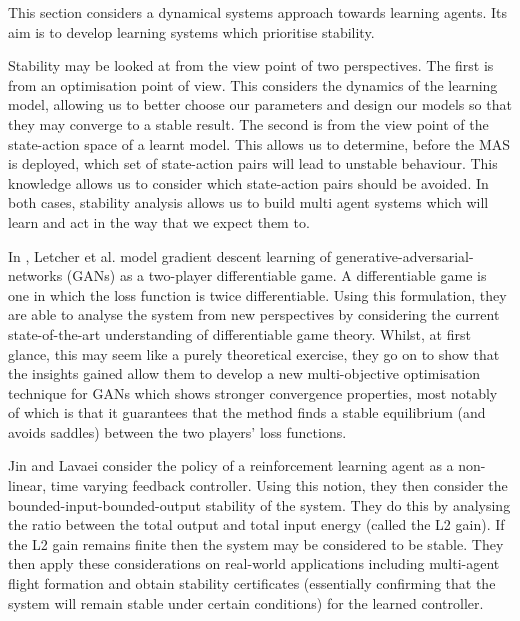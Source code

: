 \documentclass[../sample.tex]{subfiles}
\begin{document}
This section considers a dynamical systems approach towards learning agents. Its aim is to develop learning systems which prioritise stability. 

Stability may be looked at from the view point of two perspectives. The first is from an
optimisation point of view. This considers the dynamics of the learning model, allowing us to better
choose our parameters and design our models so that they may converge to a stable result. The second
is from the view point of the state-action space of a learnt model. This allows us to determine,
before the MAS is deployed, which set of state-action pairs will lead to unstable behaviour. This
knowledge allows us to consider which state-action pairs should be avoided. In both cases, stability
analysis allows us to build multi agent systems which will learn and act in the way that we expect
them to.

In \cite{Letcher2019DifferentiableMechanics}, Letcher et al. model gradient descent learning of
generative-adversarial-networks (GANs) as a two-player differentiable game. A differentiable game is
one in which the loss function is twice differentiable. Using this formulation, they are able to
analyse the system from new perspectives by considering the current state-of-the-art understanding
of differentiable game theory. Whilst, at first glance, this may seem like a purely theoretical
exercise, they go on to show that the insights gained allow them to develop a new multi-objective
optimisation technique for GANs which shows stronger convergence properties, most notably of which
is that it guarantees that the method finds a stable equilibrium (and avoids saddles) between the
two players' loss functions.

Jin and Lavaei \cite{Jin2018Stability-certifiedPerspective} consider the policy of a reinforcement
learning agent as a non-linear, time varying feedback controller. Using this notion, they then
consider the bounded-input-bounded-output stability of the system. They do this by analysing the
ratio between the total output and total input energy (called the L2 gain). If the L2 gain remains
finite then the system may be considered to be stable. They then apply these considerations on
real-world applications including multi-agent flight formation and obtain stability certificates
(essentially confirming that the system will remain stable under certain conditions) for the learned
controller.
\end{document}
